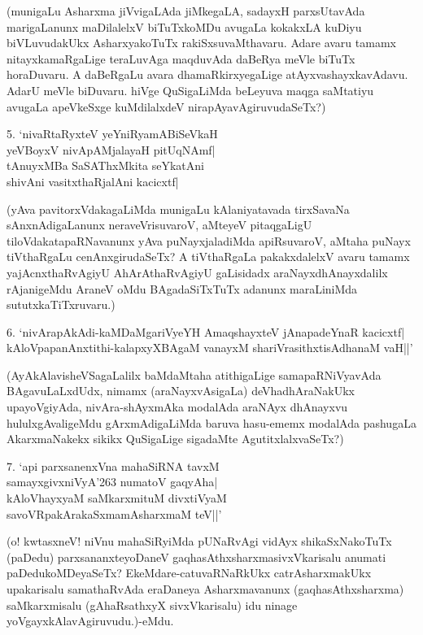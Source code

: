 \begin{itemize}
(munigaLu Asharxma jiVvigaLAda jiMkegaLA, sadayxH parxsUtavAda marigaLanunx maDilalelxV biTuTxkoMDu avugaLa kokakxLA kuDiyu biVLuvudakUkx AsharxyakoTuTx rakiSxsuvaMthavaru. Adare avaru tamamx nitayxkamaRgaLige teraLuvAga maqduvAda daBeRya meVle biTuTx horaDuvaru. A daBeRgaLu avara dhamaRkirxyegaLige atAyxvashayxkavAdavu. AdarU meVle biDuvaru. hiVge QuSigaLiMda beLeyuva maqga saMtatiyu avugaLa apeVkeSxge kuMdilalxdeV nirapAyavAgiruvudaSeTx?)

\begin{shloka}
\item[5.] `nivaRtaRyxteV yeYniRyamABiSeVkaH\\
yeVBoyxV nivApAMjalayaH pitUqNAmf|\\
tAnuyxMBa SaSAThxMkita seYkatAni\\
shivAni vasitxthaRjalAni kacicxtf|
\end{shloka}

(yAva pavitorxVdakagaLiMda munigaLu kAlaniyatavada tirxSavaNa sAnxnAdigaLanunx neraveVrisuvaroV, aMteyeV pitaqgaLigU tiloVdakatapaRNavanunx yAva puNayxjaladiMda apiRsuvaroV, aMtaha puNayx tiVthaRgaLu cenAnxgirudaSeTx? A tiVthaRgaLa pakakxdalelxV avaru tamamx yajAcnxthaRvAgiyU AhArAthaRvAgiyU gaLisidadx araNayxdhAnayxdalilx rAjanigeMdu AraneV oMdu BAgadaSiTxTuTx adanunx maraLiniMda sututxkaTiTxruvaru.)

\begin{shloka}
\item[6.] `nivArapAkAdi-kaMDaMgariVyeYH AmaqshayxteV jAnapadeYnaR kacicxtf|\\
kAloVpapanAnxtithi-kalapxyXBAgaM vanayxM shariVrasithxtisAdhanaM vaH||'
\end{shloka}

(AyAkAlavisheVSagaLalilx baMdaMtaha atithigaLige samapaRNiVyavAda BAgavuLaLxdUdx, nimamx (araNayxvAsigaLa) deVhadhAraNakUkx upayoVgiyAda, nivAra-shAyxmAka modalAda araNAyx dhAnayxvu hululxgAvaligeMdu gArxmAdigaLiMda baruva hasu-ememx modalAda pashugaLa AkarxmaNakekx sikikx QuSigaLige sigadaMte AgutitxlalxvaSeTx?)

\begin{shloka}
\item[7.] `api parxsanenxVna mahaSiRNA tavxM\\
samayxgivxniVyA\char'263 numatoV gaqyAha|\\
kAloVhayxyaM saMkarxmituM divxtiVyaM\\
savoVRpakArakaSxmamAsharxmaM teV||' 
\end{shloka}

(o! kwtasxneV! niVnu mahaSiRyiMda pUNaRvAgi vidAyx shikaSxNakoTuTx (paDedu) parxsananxteyoDaneV gaqhasAthxsharxmasivxVkarisalu anumati paDedukoMDeyaSeTx? EkeMdare-catuvaRNaRkUkx catrAsharxmakUkx upakarisalu samathaRvAda eraDaneya Asharxmavanunx (gaqhasAthxsharxma) saMkarxmisalu (gAhaRsathxyX sivxVkarisalu) idu ninage yoVgayxkAlavAgiruvudu.)-eMdu.
\end{itemize}

